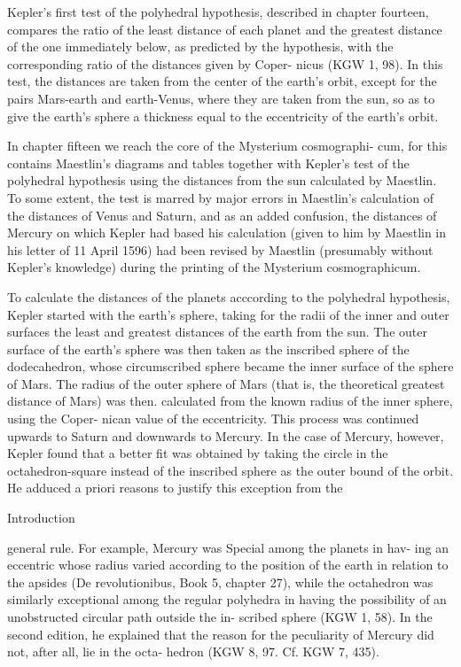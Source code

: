 \documentclass{article}
\begin{document}
Kepler’s first test of the polyhedral hypothesis, described in chapter
fourteen, compares the ratio of the least distance of each planet and the
greatest distance of the one immediately below, as predicted by the
hypothesis, with the corresponding ratio of the distances given by Coper-
nicus (KGW 1, 98). In this test, the distances are taken from the center of
the earth’s orbit, except for the pairs Mars-earth and earth-Venus, where
they are taken from the sun, so as to give the earth’s sphere a thickness
equal to the eccentricity of the earth’s orbit.

In chapter fifteen we reach the core of the Mysterium cosmographi-
cum, for this contains Maestlin’s diagrams and tables together with
Kepler’s test of the polyhedral hypothesis using the distances from the sun
calculated by Maestlin. To some extent, the test is marred by major errors
in Maestlin’s calculation of the distances of Venus and Saturn, and as an
added confusion, the distances of Mercury on which Kepler had based his
calculation (given to him by Maestlin in his letter of 11 April 1596) had
been revised by Maestlin (presumably without Kepler’s knowledge) during
the printing of the Mysterium cosmographicum.

To calculate the distances of the planets acccording to the polyhedral
hypothesis, Kepler started with the earth’s sphere, taking for the radii of
the inner and outer surfaces the least and greatest distances of the earth
from the sun. The outer surface of the earth’s sphere was then taken as
the inscribed sphere of the dodecahedron, whose circumscribed sphere
became the inner surface of the sphere of Mars. The radius of the outer
sphere of Mars (that is, the theoretical greatest distance of Mars) was then.
calculated from the known radius of the inner sphere, using the Coper-
nican value of the eccentricity. This process was continued upwards to
Saturn and downwards to Mercury. In the case of Mercury, however,
Kepler found that a better fit was obtained by taking the circle in the
octahedron-square instead of the inscribed sphere as the outer bound of
the orbit. He adduced a priori reasons to justify this exception from the

Introduction

general rule. For example, Mercury was Special among the planets in hav-
ing an eccentric whose radius varied according to the position of the earth
in relation to the apsides (De revolutionibus, Book 5, chapter 27), while
the octahedron was similarly exceptional among the regular polyhedra in
having the possibility of an unobstructed circular path outside the in-
scribed sphere (KGW 1, 58). In the second edition, he explained that the
reason for the peculiarity of Mercury did not, after all, lie in the octa-
hedron (KGW 8, 97. Cf. KGW 7, 435).
\end{document}
